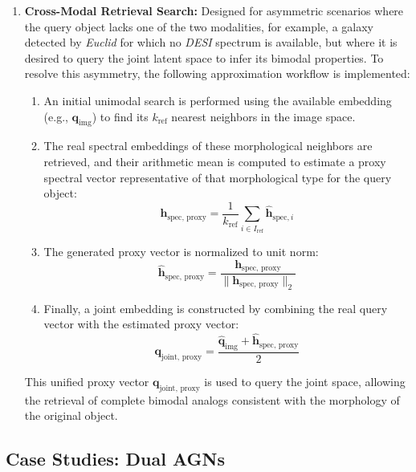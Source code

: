 \begin{enumerate}
	\item \textbf{Cross-Modal Retrieval Search:}
	Designed for asymmetric scenarios where the query object lacks one of the two modalities, for example, a galaxy detected by \textit{Euclid} for which no \textit{\gls{DESI}} spectrum is available, but where it is desired to query the joint latent space to infer its bimodal properties. To resolve this asymmetry, the following approximation workflow is implemented:
	\begin{enumerate}
		\item An initial unimodal search is performed using the available embedding (e.g., $\mathbf{q}_{\text{img}}$) to find its $k_{\text{ref}}$ nearest neighbors in the image space.
		\item The real spectral embeddings of these morphological neighbors are retrieved, and their arithmetic mean is computed to estimate a proxy spectral vector representative of that morphological type for the query object:
		\begin{equation}
		\mathbf{h}_{\text{spec, proxy}} = \frac{1}{k_{\text{ref}}} \sum_{i \in I_{\text{ref}}} \hat{\mathbf{h}}_{\text{spec}, i}
		\label{eq:ap_proxy}
		\end{equation}
		\item The generated proxy vector is normalized to unit norm:
		\begin{equation}
		\hat{\mathbf{h}}_{\text{spec, proxy}} = \frac{\mathbf{h}_{\text{spec, proxy}}}{\|\mathbf{h}_{\text{spec, proxy}}\|_2}
		\label{eq:ap_norm_proxy}
		\end{equation}
		\item Finally, a joint embedding is constructed by combining the real query vector with the estimated proxy vector:
		\begin{equation}
		\mathbf{q}_{\text{joint, proxy}} = \frac{\hat{\mathbf{q}}_{\text{img}} + \hat{\mathbf{h}}_{\text{spec, proxy}}}{2}
		\label{eq:ap_q_proxy}
		\end{equation}
	\end{enumerate}
	This unified proxy vector $\mathbf{q}_{\text{joint, proxy}}$ is used to query the joint space, allowing the retrieval of complete bimodal analogs consistent with the morphology of the original object.
\end{enumerate}

\subsection{Case Studies: Dual AGNs}

